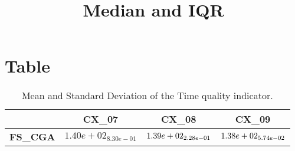 \documentclass{article}
\title{Median and IQR}
\author{}
\begin{document}
\maketitle
\section{Table}
\begin{table}[!htp]
  \caption{Mean and Standard Deviation of the Time quality indicator.}
  \label{table:Time}
  \centering
  \begin{scriptsize}
  \begin{tabular}{c|ccc}
      & \textbf{CX\_07} & \textbf{CX\_08} & \textbf{CX\_09} \\\hline
      \textbf{FS_CGA} & $1.40e+02_{8.30e-01} $ & $ \cellcolor{gray95} 1.39e+02_{2.28e-01} $ & $ \cellcolor{gray25} 1.38e+02_{5.74e-02}$ \\
  \end{tabular}
  \end{scriptsize}
\end{table}
\end{document}
